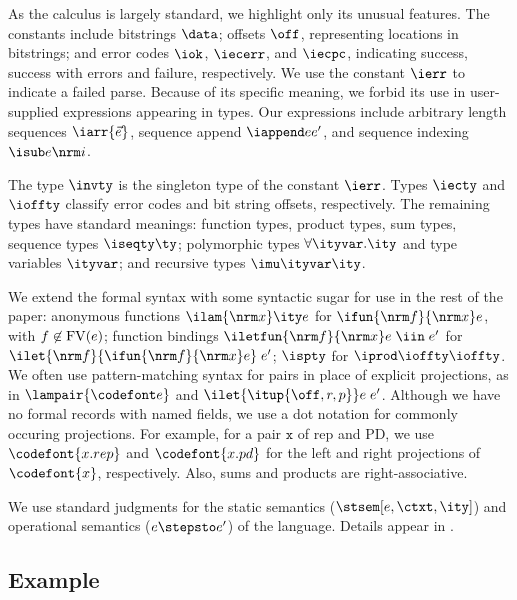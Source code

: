 As the calculus is largely standard, we highlight only its
unusual features. The constants include bitstrings $\data$; offsets $\off$,
representing locations in bitstrings; and error codes $\iok$,
$\iecerr$, and $\iecpc$, indicating success, success with errors and
failure, respectively. We use the constant $\ierr$ to indicate a
failed parse.  
Because of its specific meaning, we forbid its use in user-supplied expressions
appearing in \ddc{} types. 
Our expressions include arbitrary length
sequences $\iarr{\vec e}$, sequence append $\iappend e
{e'}$, and sequence indexing $\isub e {\nrm i}$.

The type $\invty$ is the singleton type of the constant $\ierr$.
Types $\iecty$ and $\ioffty$ classify error codes and bit string
offsets, respectively. The remaining types have standard
meanings: function types, product types, sum types, sequence types
$\iseqty \ty$; polymorphic types $\forall \ityvar.\ity$ and type
variables $\ityvar$; and recursive types $\imu \ityvar \ity$.

We extend the formal syntax with some syntactic sugar 
for use in the rest of the paper: anonymous functions
$\ilam {\nrm x} \ity e$ for $\ifun {\nrm f} {\nrm x} e$, with $f
\not\in {\rm FV}(e)$; function bindings $\iletfun {\nrm f} {\nrm x} e
\; \iin \; e'$ for $\ilet {\nrm f} {\ifun {\nrm f} {\nrm x} e} \; e'$;
$\ispty$ for $\iprod \ioffty \ioffty$.  We often use
pattern-matching syntax for pairs in place of explicit projections, as
in $\lampair{\codefont e}$ and $\ilet {\itup{\off,r,p}} e\; e'$.  Although
we have no formal records with named fields, we use a dot notation for
commonly occuring projections. For example, for a pair $\mathtt x$ of
rep and PD, we use $\codefont{x.rep}$ and $\codefont{x.pd}$ for the
left and right projections of $\codefont{x}$, respectively.  Also, sums and products are
right-associative. 

We use standard judgments for the static semantics
($\stsem[e,{\ctxt},\ity]$) and operational semantics ($e
\stepsto e'$) of the \implang{} language. Details appear in .

\subsection{Example}
\label{sec:ddc-example}

